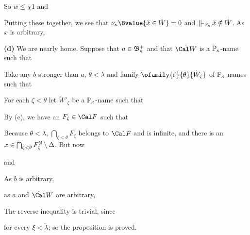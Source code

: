 {

\noindent So $w\le\chi 1$ and


\noindent Putting these together, we see that
$\bar\nu_{\kappa}\Bvalue{\check x\in\dot W}=0$ and
$\VVdPk\,\check x\notin\dot W$.   As $x$ is arbitrary,


\medskip

{\bf (d)} We are nearly home.   Suppose that $a\in\frak B_{\kappa}^+$
and that $\dot{\Cal W}$ is a $\Bbb P_{\kappa}$-name such that


\noindent Take any $b$ stronger than $a$, $\theta<\lambda$ and family
$\ofamily{\zeta}{\theta}{\dot W_{\zeta}}$ of $\Bbb P_{\kappa}$-names such that


\noindent For each $\zeta<\theta$ let $\dot W'_{\zeta}$ be a $\Bbb P_{\kappa}$-name
such that


\noindent By (c), we have an $F_{\zeta}\in\Cal F$ such that


\noindent Because $\theta<\lambda$, $\bigcap_{\zeta<\theta}F_{\zeta}$
belongs to $\Cal F$ and is infinite, and there is an
$x\in\bigcap_{\zeta<\theta}F_{\zeta}^{\Bbb N}\setminus\Delta$.   But now


\noindent and


\noindent As $b$ is arbitrary,


\noindent as $a$ and $\dot\Cal W$ are arbitrary,


\noindent The reverse inequality is trivial, since


\noindent for every $\xi<\check\lambda$;  so the proposition is proved.
}%

